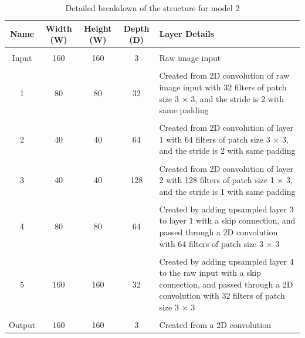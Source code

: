 \documentclass[a4paper]{article}
\begin{document}
\begin{table}[h]
\centering
\caption{Detailed breakdown of the structure for model 2}\scriptsize
\begin{tabular}{ccccp{8cm}}
\toprule
\textbf{Name} & \textbf{Width (W)} & \textbf{Height (W)} & \textbf{Depth (D)} & Layer Details\\  
\midrule
 & & & &\\
Input & 160 & 160 & 3 & Raw image input\\
 & & & &\\
1 & 80 & 80 & 32 & Created from 2D convolution of raw image input with 32 filters of patch size 3 $\times $ 3, and the stride is 2 with same padding\\
 & & & &\\
2 & 40 & 40 & 64 & Created from 2D convolution of layer 1 with 64 filters of patch size 3 $\times $ 3, and the stride is 2 with same padding\\
 & & & &\\
3 & 40 & 40 & 128 & Created from 2D convolution of layer 2 with 128 filters of patch size 1 $\times$ 3, and the stride is 1 with same padding\\
 & & & &\\
4 & 80 & 80 & 64 & Created by adding upsampled layer 3 to layer 1 with a skip connection, and passed through a 2D convolution with 64 filters of patch size 3 $\times$ 3\\
 & & & &\\
5 & 160 & 160 & 32 & Created by adding upsampled layer 4 to the raw input with a skip connection, and passed through a 2D convolution with 32 filters of patch size 3 $\times$ 3\\
 & & & &\\
Output & 160 & 160 & 3 & Created from a 2D convolution\\
\bottomrule
\end{tabular}
\end{table}

\newpage
\end{document}
